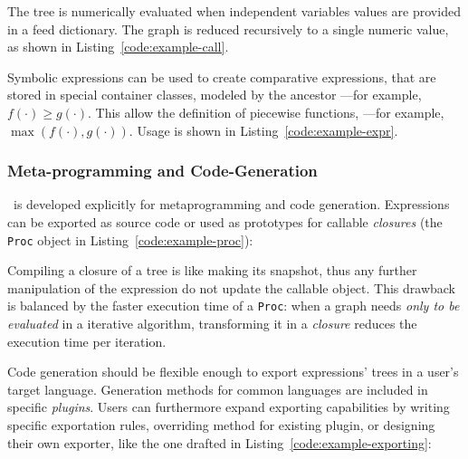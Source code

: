 \noindent%


The tree is numerically evaluated when independent variables values are provided in a feed dictionary. The graph is reduced recursively to a single numeric value, as shown in Listing~\ref{code:example-call}.

\noindent%



Symbolic expressions can be used to create comparative expressions, that are stored in special container classes, modeled by the ancestor \CASExpression---for example, $f(\cdot) \geq g(\cdot)$. This allow the definition of piecewise functions, ---for example, $\max(f(\cdot), g(\cdot))$. Usage is shown in Listing~\ref{code:example-expr}.

\noindent%


\subsubsection{Meta-programming and Code-Generation}

\ragnicas~is developed explicitly for {meta\-programming} and code generation. Expressions can be exported as source code or used as prototypes for callable \emph{closures} (the \texttt{Proc} object in Listing~\ref{code:example-proc}):

\noindent%


Compiling a closure of a tree is like making its snapshot, thus any further manipulation of the expression do not update the callable object. This drawback is balanced by the faster execution time of a \texttt{Proc}: when a graph needs \emph{only to be evaluated} in a iterative algorithm, transforming it in a \emph{closure} reduces the execution time per iteration.

Code generation should be flexible enough to export expressions' trees in a user's target language. Generation methods for common languages are included in specific \emph{plugins}. Users can furthermore expand exporting capabilities by writing specific exportation rules, overriding method for existing plugin, or designing their own exporter, like the one drafted in Listing~\ref{code:example-exporting}:

\noindent%

